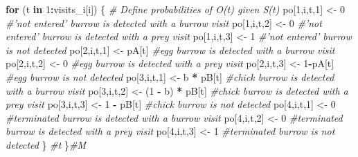 \documentclass[]{article}
\newenvironment{Shaded}{\begin{snugshade}}{\end{snugshade}}
\newcommand{\DecValTok}[1]{\textcolor[rgb]{0.00,0.00,0.81}{#1}}
\newcommand{\StringTok}[1]{\textcolor[rgb]{0.31,0.60,0.02}{#1}}
\newcommand{\CommentTok}[1]{\textcolor[rgb]{0.56,0.35,0.01}{\textit{#1}}}
\newcommand{\ControlFlowTok}[1]{\textcolor[rgb]{0.13,0.29,0.53}{\textbf{#1}}}
\newcommand{\OperatorTok}[1]{\textcolor[rgb]{0.81,0.36,0.00}{\textbf{#1}}}
\newcommand{\NormalTok}[1]{#1}
\begin{document}
\begin{Shaded}
\begin{Highlighting}[]
   \ControlFlowTok{for}\NormalTok{ (t }\ControlFlowTok{in} \DecValTok{1}\OperatorTok{:}\NormalTok{visits_i[i]) \{}
      \CommentTok{# Define probabilities of O(t) given S(t)}
\NormalTok{      po[}\DecValTok{1}\NormalTok{,i,t,}\DecValTok{1}\NormalTok{] <-}\StringTok{ }\DecValTok{0}                        \CommentTok{#'not entered' burrow is detected with a burrow visit}
\NormalTok{      po[}\DecValTok{1}\NormalTok{,i,t,}\DecValTok{2}\NormalTok{] <-}\StringTok{ }\DecValTok{0}                        \CommentTok{#'not entered' burrow is detected with a prey visit}
\NormalTok{      po[}\DecValTok{1}\NormalTok{,i,t,}\DecValTok{3}\NormalTok{] <-}\StringTok{ }\DecValTok{1}                        \CommentTok{#'not entered' burrow is not detected}
\NormalTok{      po[}\DecValTok{2}\NormalTok{,i,t,}\DecValTok{1}\NormalTok{] <-}\StringTok{ }\NormalTok{pA[t]                    }\CommentTok{#egg burrow is detected with a burrow visit}
\NormalTok{      po[}\DecValTok{2}\NormalTok{,i,t,}\DecValTok{2}\NormalTok{] <-}\StringTok{ }\DecValTok{0}                        \CommentTok{#egg burrow is detected with a prey visit}
\NormalTok{      po[}\DecValTok{2}\NormalTok{,i,t,}\DecValTok{3}\NormalTok{] <-}\StringTok{ }\DecValTok{1}\OperatorTok{-}\NormalTok{pA[t]                  }\CommentTok{#egg burrow is not detected}
\NormalTok{      po[}\DecValTok{3}\NormalTok{,i,t,}\DecValTok{1}\NormalTok{] <-}\StringTok{ }\NormalTok{b }\OperatorTok{*}\StringTok{ }\NormalTok{pB[t]                }\CommentTok{#chick burrow is detected with a burrow visit }
\NormalTok{      po[}\DecValTok{3}\NormalTok{,i,t,}\DecValTok{2}\NormalTok{] <-}\StringTok{ }\NormalTok{(}\DecValTok{1} \OperatorTok{-}\StringTok{ }\NormalTok{b) }\OperatorTok{*}\StringTok{ }\NormalTok{pB[t]          }\CommentTok{#chick burrow is detected with a prey visit}
\NormalTok{      po[}\DecValTok{3}\NormalTok{,i,t,}\DecValTok{3}\NormalTok{] <-}\StringTok{ }\DecValTok{1} \OperatorTok{-}\StringTok{ }\NormalTok{pB[t]                }\CommentTok{#chick burrow is not detected}
\NormalTok{      po[}\DecValTok{4}\NormalTok{,i,t,}\DecValTok{1}\NormalTok{] <-}\StringTok{ }\DecValTok{0}                        \CommentTok{#terminated burrow is detected with a burrow visit}
\NormalTok{      po[}\DecValTok{4}\NormalTok{,i,t,}\DecValTok{2}\NormalTok{] <-}\StringTok{ }\DecValTok{0}                        \CommentTok{#terminated burrow is detected with a prey visit}
\NormalTok{      po[}\DecValTok{4}\NormalTok{,i,t,}\DecValTok{3}\NormalTok{] <-}\StringTok{ }\DecValTok{1}                        \CommentTok{#terminated burrow is not detected}
\NormalTok{  \} }\CommentTok{#t}
\NormalTok{ \}}\CommentTok{#M}


\end{Highlighting}
\end{Shaded}
\end{document}
